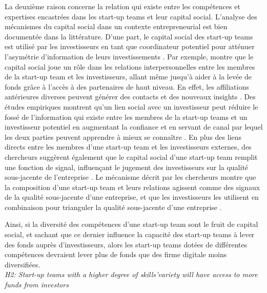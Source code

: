 \documentclass[12pt]{article}
\begin{document}
La deuxième raison concerne la relation qui existe entre les compétences et expertises encastrées dans les start-up teams et leur capital social. L'analyse des mécanismes du capital social dans un contexte entrepreneurial est bien documentée dans la littérature. D'une part, le capital social des start-up teams est utilisé par les investisseurs en tant que coordinateur potentiel pour atténuer l'asymétrie d'information de leurs investissements \citep{ko2018signaling}. Par exemple, \citet{shane2002network} montre que le capital social joue un rôle dans les relations interpersonnelles entre les membres de la start-up team et les investisseurs, allant même jusqu'à aider à la levée de fonds grâce à l'accès à des partenaires de haut niveau. En effet, les affiliations antérieures diverses peuvent générer des contacts et des nouveaux insights \citep{beckman2007early}. Des études empiriques montrent qu'un lien social avec un investisseur peut réduire le fossé de l'information qui existe entre les membres de la start-up teams et un investisseur potentiel en augmentant la confiance et en servant de canal par lequel les deux parties peuvent apprendre à mieux se connaître \citep{huang2017resources, shane2002network, shane2002organizational}. En plus des liens directs entre les membres d'une start-up team et les investisseurs externes, des chercheurs suggèrent également que le capital social d'une start-up team remplit une fonction de signal, influençant le jugement des investisseurs sur la qualité sous-jacente de l'entreprise \citep{hoenig2015quality, shane2002organizational}. Le mécanisme décrit par les chercheurs montre que la composition d'une start-up team et leurs relations agissent comme des signaux de la qualité sous-jacente d'une entreprise, et que les investisseurs les utilisent en combinaison pour trianguler la qualité sous-jacente d'une entreprise \citep{plummer2016better, semrau2014exactly}.

Ainsi, si la diversité des compétences d'une start-up team sont le fruit de capital social, et sachant que ce dernier influence la capacité des start-up teams à lever des fonds auprès d'investisseurs, alors les start-up teams dotées de différentes compétences devraient lever plus de fonds que des firme digitale moins diversifiées. \\

\noindent \textit{H2: Start-up teams with a higher degree of skills'variety will have access to more funds from investors} \\

\end{document}
